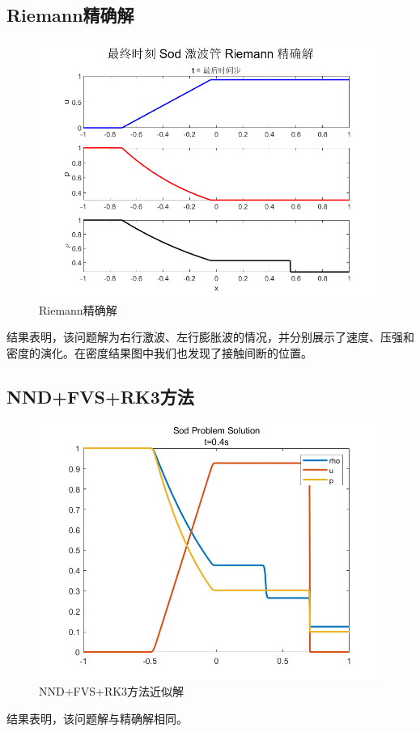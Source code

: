 \documentclass[12pt,a4paper]{article}%
\begin{document}
		\subsection{Riemann精确解}
		\begin{figure}[H]
		\centering
		\begin{minipage}{0.83\textwidth}
			\centering
			\includegraphics[width=\textwidth]{./fig/Riemann.png}
			\caption{\fontsize{10pt}{15pt}\selectfont Riemann精确解}
		\end{minipage}
		\end{figure}
		结果表明，该问题解为右行激波、左行膨胀波的情况，并分别展示了速度、压强和密度的演化。在密度结果图中我们也发现了接触间断的位置。

		\subsection{NND+FVS+RK3方法}
		\begin{figure}[H]
			\centering
			\begin{minipage}{0.83\textwidth}
				\centering
				\includegraphics[width=\textwidth]{./fig/app1.png}
				\caption{\fontsize{10pt}{15pt}\selectfont NND+FVS+RK3方法近似解}
			\end{minipage}
		\end{figure}
		结果表明，该问题解与精确解相同。	
		
\end{document}
